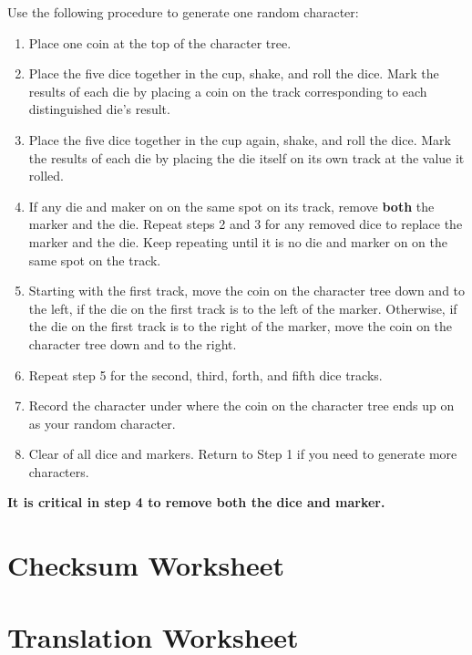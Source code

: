 \documentclass{article}
\newcommand{\tmstrong}[1]{\textbf{#1}}
\newenvironment{enumeratenumeric}{\begin{enumerate}[1.] }{\end{enumerate}}
\begin{document}
Use the following procedure to generate one random character:
\begin{enumeratenumeric}
  \item Place one coin at the top of the character tree.
  
  \item Place the five dice together in the cup, shake, and roll the dice.
  Mark the results of each die by placing a coin on the track corresponding to
  each distinguished die's result.
  
  \item Place the five dice together in the cup again, shake, and roll the
  dice. Mark the results of each die by placing the die itself on its own
  track at the value it rolled.
  
  \item If any die and maker on on the same spot on its track, remove
  {\tmstrong{both}} the marker and the die. Repeat steps 2 and 3 for any
  removed dice to replace the marker and the die. Keep repeating until it is
  no die and marker on on the same spot on the track.
  
  \item Starting with the first track, move the coin on the character tree
  down and to the left, if the die on the first track is to the left of the
  marker. Otherwise, if the die on the first track is to the right of the
  marker, move the coin on the character tree down and to the right.
  
  \item Repeat step 5 for the second, third, forth, and fifth dice tracks.
  
  \item Record the character under where the coin on the character tree ends
  up on as your random character.
  
  \item Clear of all dice and markers. Return to Step 1 if you need to
  generate more characters.
\end{enumeratenumeric}
{\tmstrong{It is critical in step 4 to remove both the dice and marker.}}

\section{Checksum Worksheet}

\section{Translation Worksheet}
\end{document}

